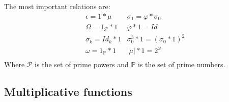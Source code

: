  The most important relations are:
 \begin{align*}
	&\epsilon = 1*\mu & \sigma_1 =\varphi * \sigma_0 \\
	&\Omega = 1_{\mathcal{P}}*1 & \varphi * 1 = Id \\
	&\sigma_k = Id_k* 1 & \sigma_0^3*1 = (\sigma_0 *1)^2 \\
	&\omega = 1_{\mathbb{P}}*1 & |\mu|*1= 2^\omega \\
 \end{align*}
 Where $\mathcal{P}$ is the set of prime powers and $\mathbb{P}$ is the set of prime numbers.
\subsection{Multiplicative functions}
